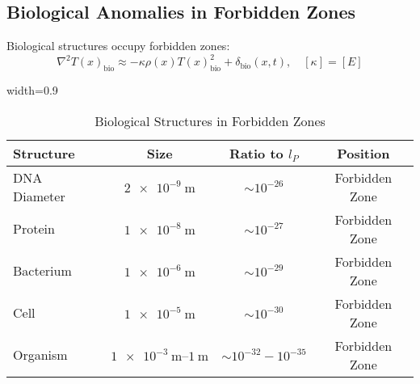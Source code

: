 ﻿\documentclass[12pt,a4paper]{article}
\newcommand{\Tfield}{T(x)}
\newcommand{\tablescale}{0.9}
\begin{document}
\begin{itemize}
	\subsection{Biological Anomalies in Forbidden Zones}
	\label{sec:bio_anomalies}
	
	Biological structures occupy forbidden zones:
	\[
	\nabla^2 \Tfield_{\text{bio}} \approx -\kappa \rho(x) \Tfield_{\text{bio}}^2 + \delta_{\text{bio}}(x,t), \quad [\kappa] = [E]
	\]
	
	\begin{table}[htbp]
		\centering
		\begin{adjustbox}{width=\tablescale\textwidth}
			\begin{tabular}{lccc}
				\toprule
				\textbf{Structure} & \textbf{Size} & \textbf{Ratio to \(l_P\)} & \textbf{Position} \\
				\midrule
				DNA Diameter & \(\SI{2e-9}{\meter}\) & \(\sim 10^{-26}\) & Forbidden Zone \\
				Protein & \(\SI{1e-8}{\meter}\) & \(\sim 10^{-27}\) & Forbidden Zone \\
				Bacterium & \(\SI{1e-6}{\meter}\) & \(\sim 10^{-29}\) & Forbidden Zone \\
				Cell & \(\SI{1e-5}{\meter}\) & \(\sim 10^{-30}\) & Forbidden Zone \\
				Organism & \(\SIrange{1e-3}{1}{\meter}\) & \(\sim 10^{-32} - 10^{-35}\) & Forbidden Zone \\
				\bottomrule
			\end{tabular}
		\end{adjustbox}
		\caption{Biological Structures in Forbidden Zones}
		\label{tab:bio_anomalies}
	\end{table}
	

\end{itemize}
\end{document}
